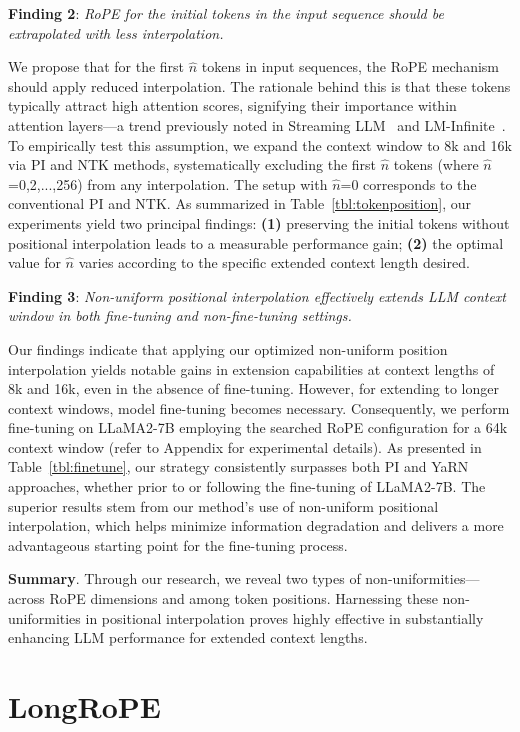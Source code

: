 \textbf{Finding 2}: \textit{RoPE for the initial tokens in the input sequence should be extrapolated with less interpolation.} 

We propose that for the first $\hat{n}$ tokens in input sequences, the RoPE mechanism should apply reduced interpolation. The rationale behind this is that these tokens typically attract high attention scores, signifying their importance within attention layers—a trend previously noted in Streaming LLM~\cite{streamingllm} and LM-Infinite~\cite{han2023lminfinite}. To empirically test this assumption, we expand the context window to 8k and 16k via PI and NTK methods, systematically excluding the first $\hat n$ tokens (where $\hat n$=0,2,...,256) from any interpolation. The setup with $\hat n$=0 corresponds to the conventional PI and NTK. As summarized in Table~\ref{tbl:tokenposition}, our experiments yield two principal findings: \textbf{(1)} preserving the initial tokens without positional interpolation leads to a measurable performance gain; \textbf{(2)} the optimal value for $\hat n$ varies according to the specific extended context length desired.

\textbf{Finding 3}: \textit{Non-uniform positional interpolation effectively extends LLM context window in both fine-tuning and non-fine-tuning settings.} 

Our findings indicate that applying our optimized non-uniform position interpolation yields notable gains in extension capabilities at context lengths of 8k and 16k, even in the absence of fine-tuning. However, for extending to longer context windows, model fine-tuning becomes necessary. Consequently, we perform fine-tuning on LLaMA2-7B employing the searched RoPE configuration for a 64k context window (refer to Appendix for experimental details). As presented in Table~\ref{tbl:finetune}, our strategy consistently surpasses both PI and YaRN approaches, whether prior to or following the fine-tuning of LLaMA2-7B. The superior results stem from our method’s use of non-uniform positional interpolation, which helps minimize information degradation and delivers a more advantageous starting point for the fine-tuning process.

\textbf{Summary}. Through our research, we reveal two types of non-uniformities—across RoPE dimensions and among token positions. Harnessing these non-uniformities in positional interpolation proves highly effective in substantially enhancing LLM performance for extended context lengths.

\section{LongRoPE}


